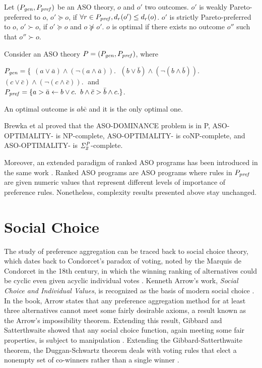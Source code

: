 \begin{definition}
	Let $(P_{\mathit{gen}}, P_{\mathit{pref}})$ be an ASO theory,
	$o$ and $o'$ two outcomes.
	$o'$ is weakly Pareto-preferred to $o$, $o' \succeq o$,
	if $\forall r \in P_{\mathit{pref}}, d_r(o') \leq d_r(o)$.
	$o'$ is strictly Pareto-preferred to $o$, $o' \succ o$,
	if $o' \succeq o$ and $o \not \succeq o'$.
	$o$ is optimal if there exists no outcome $o''$ such that
	$o'' \succ o$.
\end{definition}

Consider an ASO theory $P=(P_{\mathit{gen}}, P_{\mathit{pref}})$, where
\begin{center}
	$P_{\mathit{gen}}=\{$
	$(a \lor \bar{a}) \land (\neg (a \land \bar{a})). \;$
	$(b \lor \bar{b}) \land (\neg (b \land \bar{b})). \;$
	$(c \lor \bar{c}) \land (\neg (c \land \bar{c})). \;$
	and\\
	$P_{\mathit{pref}}=\{
		a > \bar{a} \leftarrow b \vee c. \;\;
		b \wedge \bar{c} > \bar{b} \wedge c.
	\}$.
\end{center}
An optimal outcome is $ab\bar{c}$ and it is the only optimal one.

Brewka et al \cite{Brewka03answerset} proved that
the ASO-DOMINANCE problem is in P, ASO-OPTIMALITY-
is NP-complete, ASO-OPTIMALITY- is coNP-complete,
and ASO-OPTIMALITY- is $\mathit{\Sigma^P_{2}}$-complete.

Moreover, an extended paradigm of ranked ASO programs has
been introduced in the same work \cite{Brewka03answerset}.
Ranked ASO programs are ASO programs where rules in $P_{\mathit{pref}}$
are given numeric values that represent different levels of importance
of preference rules.  Nonetheless, complexity results presented
above stay unchanged.




\section{Social Choice}
The study of preference aggregation can be traced back to social choice theory,
which dates back to Condorcet's paradox of voting, noted by the
Marquis de Condorcet in the 18th century, in which
the winning ranking of alternatives could be cyclic even 
given acyclic individual votes \cite{wiki:soc}.
Kenneth Arrow's work, \textit{Social Choice and Individual Values},
is recognized as the basis of modern social choice \cite{aarrow:b:socialchoice}.
In the book, Arrow states that any preference aggregation method for at least three
alternatives cannot meet some fairly desirable axioms, a result known as
the Arrow's impossibility theorem.
Extending this result, Gibbard and Satterthwaite showed
that any social choice function, again meeting some fair properties, is subject
to manipulation \cite{gib:j:maip-scheme,satt:j:strat-proof}.
Extending the Gibbard-Satterthwaite theorem, the Duggan-Schwartz theorem deals with 
voting rules that elect a nonempty set of co-winners rather than a single winner
\cite{dug-sch:j:maipres}.

